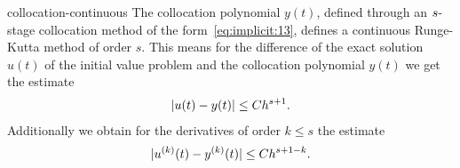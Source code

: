 \begin{Theorem}{collocation-continuous}
   The collocation polynomial
  $y(t)$, defined through an $s$-stage collocation method of the
  form~\eqref{eq:implicit:13}, defines a continuous Runge-Kutta method
  of order $s$. This means for the difference of the exact solution
  $u(t)$ of the initial value problem and the collocation polynomial
  $y(t)$ we get the estimate
  \begin{gather}
    \label{eq:implicit:15}
    \lvert u(t)-y(t)\rvert \le C h^{s+1}.
  \end{gather}
  Additionally we obtain for the derivatives of order $k\le s$ the
	estimate
  \begin{gather}
    \label{eq:implicit:16}
    \lvert u^{(k)}(t)-y^{(k)}(t)\rvert \le C h^{s+1-k}.
  \end{gather}
\end{Theorem}
